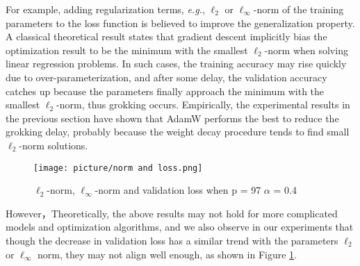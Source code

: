 \documentclass{article}
\begin{document}
For example, adding regularization terms, \textit{e.g.}, $\ell_2$ or $\ell_\infty$-norm of the training parameters to the loss function is believed to improve the generalization property. A classical theoretical result states that gradient descent implicitly bias the optimization result to be the minimum with the smallest $\ell_2$-norm when solving linear regression problems. In such cases, the training accuracy may rise quickly due to over-parameterization, and after some delay, the validation accuracy catches up because the parameters finally approach the minimum with the smallest $\ell_2$-norm, thus grokking occurs. Empirically, the experimental results in the previous section have shown that AdamW performs the best to reduce the grokking delay, probably because the weight decay procedure tends to find small $\ell_2$-norm solutions.

\begin{figure}[htbp]
  \centering
    \texttt{[image: picture/norm and loss.png]}
    \renewcommand{\figurename}{Figure}
    \caption{$\ell_2$-norm, $\ell_\infty$-norm and validation loss when p = 97 $\alpha$ = 0.4}
  \label{fig7:main}
\end{figure}


However，Theoretically, the above results may not hold for more complicated models and optimization algorithms, and we also observe in our experiments that though the decrease in validation loss has a similar trend with the parameters $\ell_2$ or $\ell_\infty$ norm, they may not align well enough, as shown in Figure \ref{fig7:main}. 

\textbf{}
\vspace{-1em}
\end{document}

